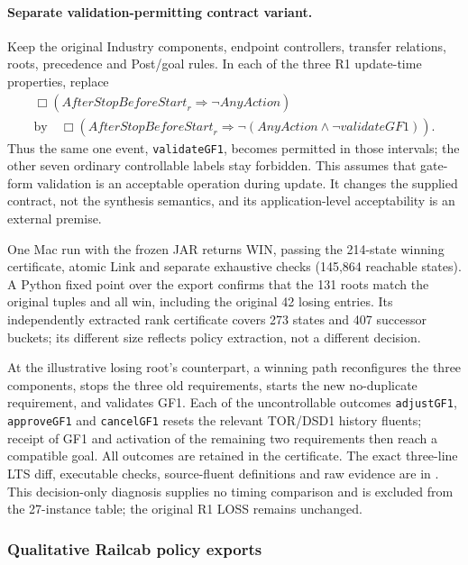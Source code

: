 \documentclass[11pt]{article}
\begin{document}
\paragraph{Separate validation-permitting contract variant.}
Keep the original Industry components, endpoint controllers, transfer relations, roots, precedence and Post/goal rules. In each of the three R1 update-time properties, replace
\[
\begin{gathered}
\Box(\mathit{AfterStopBeforeStart}_r\Rightarrow\neg\mathit{AnyAction})\\
\text{by}\quad
\Box(\mathit{AfterStopBeforeStart}_r\Rightarrow
\neg(\mathit{AnyAction}\land\neg\mathit{validateGF1})).
\end{gathered}
\]
Thus the same one event, \texttt{validateGF1}, becomes permitted in those intervals; the other seven ordinary controllable labels stay forbidden. This assumes that gate-form validation is an acceptable operation during update. It changes the supplied contract, not the synthesis semantics, and its application-level acceptability is an external premise.

One Mac run with the frozen JAR returns WIN, passing the 214-state winning certificate, atomic Link and separate exhaustive checks (145,864 reachable states). A Python fixed point over the export confirms that the 131 roots match the original tuples and all win, including the original 42 losing entries. Its independently extracted rank certificate covers 273 states and 407 successor buckets; its different size reflects policy extraction, not a different decision.

At the illustrative losing root's counterpart, a winning path reconfigures the three components, stops the three old requirements, starts the new no-duplicate requirement, and validates GF1. Each of the uncontrollable outcomes \texttt{adjustGF1}, \texttt{approveGF1} and \texttt{cancelGF1} resets the relevant TOR/DSD1 history fluents; receipt of GF1 and activation of the remaining two requirements then reach a compatible goal. All outcomes are retained in the certificate. The exact three-line LTS diff, executable checks, source-fluent definitions and raw evidence are in . This decision-only diagnosis supplies no timing comparison and is excluded from the 27-instance table; the original R1 LOSS remains unchanged.

\clearpage
\subsubsection{Qualitative Railcab policy exports}
\label{supp:railcab-exports}
\end{document}

